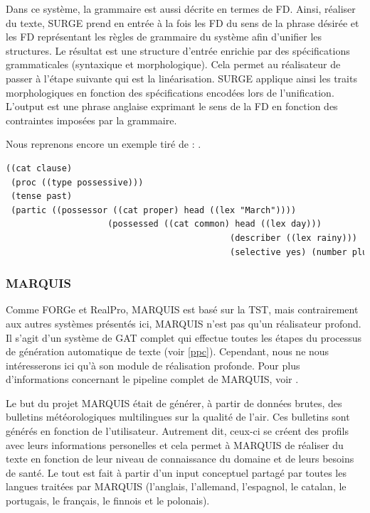Dans ce système, la grammaire est aussi décrite en termes de \ac{FD}. Ainsi, réaliser du texte, SURGE prend en entrée à la fois les \ac{FD} du sens de la phrase désirée et les \ac{FD} représentant les règles de grammaire du système afin d'unifier les structures. Le résultat est une structure d'entrée enrichie par des spécifications grammaticales (syntaxique et morphologique). Cela permet au réalisateur de passer à l'étape suivante qui est la linéarisation. SURGE applique ainsi les traits morphologiques en fonction des spécifications encodées lors de l'unification. L'output est une phrase anglaise exprimant le sens de la \ac{FD} en fonction des contraintes imposées par la grammaire.

Nous reprenons encore un exemple tiré de \cite{ReiterBuildingNaturalLanguage2000}: .

\begin{minipage}{\linewidth}
\begin{lstlisting}[language=Xml, caption=FD: input de Surge, label=surge]
((cat clause)
 (proc ((type possessive)))
 (tense past)
 (partic ((possessor ((cat proper) head ((lex "March"))))
					(possessed ((cat common) head ((lex day)))
											(describer ((lex rainy)))
											(selective yes) (number plural)))))
\end{lstlisting}
\end{minipage}

\subsubsection{MARQUIS}\label{sectionmarquis}
Comme FORGe et RealPro, MARQUIS est basé sur la \ac{TST}, mais contrairement aux autres systèmes présentés ici, MARQUIS n'est pas qu'un réalisateur profond. Il s'agit d'un système de \ac{GAT} complet qui effectue toutes les étapes du processus de génération automatique de texte (voir \ref{ppc}). Cependant, nous ne nous intéresserons ici qu'à son module de réalisation profonde.\citep{Lareau2007TowardsAG} Pour plus d'informations concernant le pipeline complet de MARQUIS, voir \citep{WannerMARQUISGENERATIONUSERTAILORED2010}. 

Le but du projet MARQUIS était de générer, à partir de données brutes, des bulletins météorologiques multilingues sur la qualité de l'air. Ces bulletins sont générés en fonction de l'utilisateur. Autrement dit, ceux-ci se créent des profils avec leurs informations personelles et cela permet à MARQUIS de réaliser du texte en fonction de leur niveau de connaissance du domaine et de leurs besoins de santé. Le tout est fait à partir d'un input conceptuel partagé par toutes les langues traitées par MARQUIS (l'anglais, l'allemand, l'espagnol, le catalan, le portugais, le français, le finnois et le polonais). 

